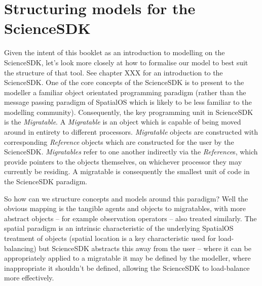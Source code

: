 \section{Structuring models for the ScienceSDK}

Given the intent of this booklet as an introduction to modelling on the
ScienceSDK, let's look more closely at how to formalise our model to best suit
the structure of that tool. See chapter XXX for an introduction to the
ScienceSDK. One of the core concepts of the ScienceSDK is to present to the
modeller a familiar object orientated programming paradigm (rather than the
message passing paradigm of SpatialOS which is likely to be less familiar to
the modelling community).  Consequently, the key programming unit in ScienceSDK
is the \textit{Migratable}.  A \textit{Migratable} is an object which is
capable of being moved around in entirety to different processors.
\textit{Migratable} objects are constructed with corresponding
\textit{Reference} objects which are constructed for the user by the
ScienceSDK. \textit{Migratables} refer to one another indirectly via the
\textit{Reference}s, which provide pointers to the objects themselves, on
whichever processor they may currently be residing. A migratable is
consequently the smallest unit of code in the ScienceSDK paradigm.

So how can we structure concepts and models around this paradigm? Well the
obvious mapping is the tangible agents and objects to migratables, with more
abstract objects -- for example observation operators -- also treated
similarly.  The spatial paradigm is an intrinsic characteristic of the
underlying SpatialOS treatment of objects (spatial location is a key
characteristic used for load-balancing) but ScienceSDK abstracts this away from
the user -- where it can be appropriately applied to a migratable it may be
defined by the modeller, where inappropriate it shouldn't be defined, allowing
the ScienceSDK to load-balance more effectively.



